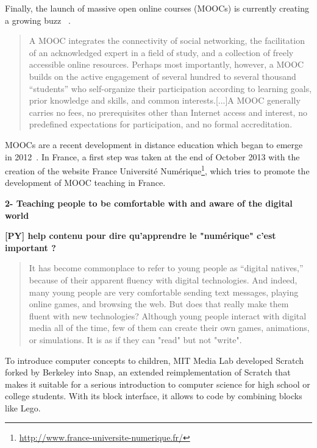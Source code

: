 Finally, the launch of massive open online courses (MOOCs) is currently creating a growing buzz ~\cite{mackness2010ideals}.

\begin{quotation}
    A MOOC integrates the connectivity of social networking, the facilitation of an acknowledged expert in a field of study, and a collection of freely accessible online resources. Perhaps most importantly, however, a MOOC builds on the active engagement of several hundred to several thousand “students” who self-organize their participation according to learning goals, prior knowledge and skills, and common interests.[...]A MOOC generally carries no fees, no prerequisites other than Internet access and interest, no predefined expectations for participation, and no formal accreditation.
\end{quotation}

MOOCs are a recent development in distance education which began to emerge in 2012~\cite{pappano2012year}. In France, a first step was taken at the end of October 2013 with the creation of the website France Université Numérique\footnote{\url{http://www.france-universite-numerique.fr/}}, which tries to promote the development of MOOC teaching in France.


\textbf{2- Teaching people to be comfortable with and aware of the digital world}

\textbf{[PY] help contenu pour dire qu'apprendre le "numérique" c'est important ?}

\begin{quotation}

    It has become commonplace to refer to young people as “digital natives,” because of their apparent fluency with digital technologies. And indeed, many young people are very comfortable sending text messages, playing online games, and browsing the web. But does that really make them fluent with new technologies? Although young people interact with digital media all of the time, few of them can create their own games, animations, or simulations. It is as if they can "read" but not "write".

\end{quotation}

To introduce computer concepts to children, MIT Media Lab developed Scratch~\cite{resnick2009scratch} forked by Berkeley into Snap, an extended reimplementation of Scratch that makes it suitable for a serious introduction to computer science for high school or college students. With its block interface, it allows to code by combining blocks like Lego.

